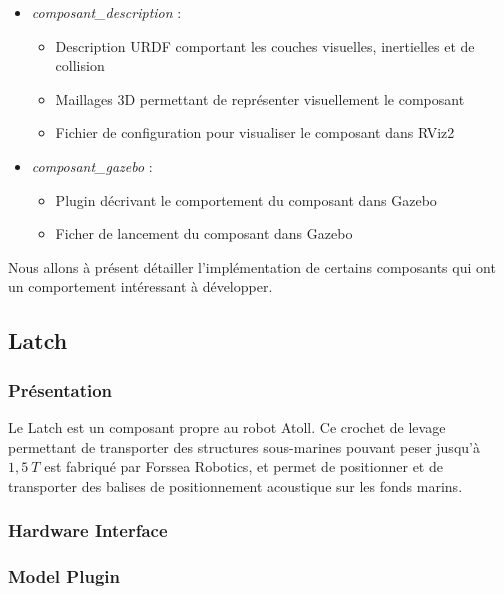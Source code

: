 			\begin{itemize}
				\renewcommand{\labelitemi}{\textbullet}
				\item \textit{composant\_description} :
				\begin{itemize}[noitemsep]
					\item Description URDF comportant les couches visuelles, inertielles et de collision
					\item Maillages 3D permettant de représenter visuellement le composant
					\item Fichier de configuration pour visualiser le composant dans RViz2
				\end{itemize}
				\item \textit{composant\_gazebo} :
				\begin{itemize}[noitemsep]
					\item \gls{Plugin} décrivant le comportement du composant dans \gls{Gazebo}
					\item Ficher de lancement du composant dans \gls{Gazebo}
				\end{itemize}
			\end{itemize}

		Nous allons à présent détailler l'implémentation de certains composants qui ont un comportement intéressant à développer.

		\subsection{Latch}

			\subsubsection{Présentation}

				Le Latch est un composant propre au robot \gls{Atoll}. Ce crochet de levage permettant de transporter des structures sous-marines pouvant peser jusqu'à $1,5\ T$ est fabriqué par Forssea Robotics, et permet de positionner et de transporter des balises de positionnement acoustique sur les fonds marins.

			\subsubsection{Hardware Interface}


				
			\subsubsection{Model Plugin}
			
